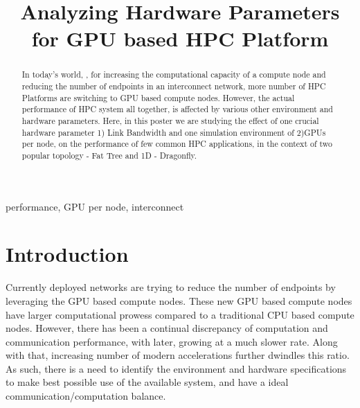 \documentclass[conference]{IEEEtran}
\begin{document}
\title{Analyzing Hardware Parameters for GPU based HPC Platform\\
}

\author{
\and
{}
\and
{}
\and
{}
}

\maketitle

\begin{abstract}
In today's world, , for increasing the computational capacity of a compute node and reducing the number of endpoints in an interconnect network, more number of HPC Platforms are switching to GPU based compute nodes. However, the actual performance of HPC system all together, is affected by various other environment and hardware parameters. Here, in this poster we are studying the effect of one crucial hardware parameter 1) Link Bandwidth and one simulation environment of 2)GPUs per node, on the performance of few common HPC applications, in the context of two popular topology - Fat Tree\cite{b1} and 1D - Dragonfly\cite{b2}.  
\end{abstract}

\begin{IEEEkeywords}
performance, GPU per node, interconnect
\end{IEEEkeywords}

\section{Introduction}


Currently deployed networks are trying to reduce the number of endpoints by leveraging the GPU based compute nodes. These new GPU based compute nodes have larger computational prowess compared to a traditional CPU based compute nodes. However, there has been a continual discrepancy of computation and communication performance, with later, growing at a much slower rate. Along with that, increasing number of modern accelerations further dwindles this ratio. As such, there is a need to identify the environment and hardware specifications to make best possible use of the available system, and have a ideal communication/computation balance.  
\end{document}
